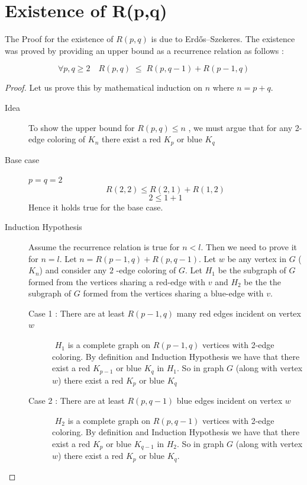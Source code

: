 \section{Existence of R(p,q)}
The Proof for the existence of $R(p,q)$ is due to Erdős–Szekeres. The existence was proved by providing an upper bound as a recurrence relation as follows :
\begin{theorem}
$$\forall p,q \geq 2 \quad R(p,q) \; \leq \; R(p,q-1) + R(p-1,q) $$
\end{theorem}
\begin{proof}
 Let us prove this by mathematical induction on $n$ where $n=p+q$.
 \begin{description}
    \item[Idea] To show the upper bound for $R(p,q) \leq n$ , we must argue that for any 2-edge coloring of $K_n$ there exist a red $K_p$ or blue $K_q$

   \item[Base case] $p=q=2$
$$R(2,2) \leq  R(2,1) + R(1,2)  $$
$$2 \leq 1+1$$
Hence it holds true for the base case.
   \item[Induction Hypothesis]
Assume the recurrence relation is true for $n<l$. Then we need to prove it for $n=l$. Let $n=R(p-1,q)+R(p,q-1)$. Let $w$ be any vertex in $G$ ($K_n$) and consider any $2$ -edge coloring of $G$. Let $H_1$ be the subgraph of $G$ formed from the vertices sharing a red-edge with $v$ and $H_2$ be the the subgraph of $G$ formed from the vertices sharing a blue-edge with $v$.
\begin{description}
   \item[Case 1 : There are at least $R(p-1,q)$ many red edges incident on vertex $w$]
   $ $ \newline
   $H_1$ is a complete graph on $R(p-1,q)$ vertices with 2-edge coloring. By definition and Induction Hypothesis we have that there exist a red $K_{p-1}$ or blue $K_q$ in $H_1$. So in graph $G$ (along with vertex $w$) there exist a red $K_p$ or blue $K_q$
   \item[Case 2 : There are at least $R(p,q-1)$ blue edges incident on vertex $w$]
      $ $ \newline
      $H_2$ is a complete graph on $R(p,q-1)$ vertices with 2-edge coloring. By definition and Induction Hypothesis we have that there exist a red $K_p$ or blue  $K_{q-1}$ in $H_2$. So in graph $G$ (along with vertex $w$) there exist a red $K_p$ or blue $K_q$.
\end{description}
   \end{description}
   
\end{proof} 
   
   
   
   
   
   
   
   
   
   
   
   
   
   
   
   
   
   
   
   
   
   
   
   
